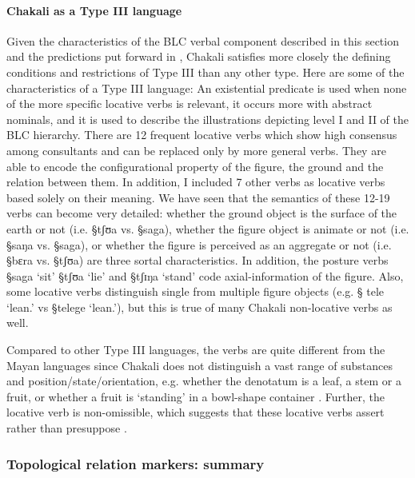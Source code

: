 \paragraph{Chakali as a Type III language}
\label{sec:SPA-cover-v}

Given the characteristics of the BLC  verbal component described in this
section and the predictions put forward in \citet[857, 863-864, 865]{Amek07b},
Chakali  satisfies more closely the defining conditions and restrictions of Type
III than any other type. Here are some of the characteristics of  a Type III
language: An existential predicate is used when
none of the more specific locative verbs is relevant, it occurs more with
abstract nominals, and it is used to describe  the  illustrations depicting
level I and II of the BLC hierarchy. There are 12 frequent locative verbs which 
show high consensus among consultants and can be replaced only by more general
verbs. They are able to encode the configurational property of the figure,
the ground
and  the relation between them. In addition, I  included 7 other verbs as
locative verbs based solely on their meaning. We have seen that the semantics of
these
12-19 verbs  can become very detailed: whether the ground object is the surface
of the earth or not (i.e.  {\S tʃʊa} vs. {\S saga}), whether the figure object
is animate or not  (i.e.  {\S saŋa} vs. {\S saga}),  or whether the figure is
perceived as an aggregate or not  (i.e.  {\S bɛra} vs. {\S tʃʊa}) are three
sortal characteristics. In addition, the posture verbs {\S saga} `sit' {\S tʃʊa}
`lie'
and {\S tʃɪŋa} `stand'   code  axial-information of the figure. Also, some
locative verbs distinguish single from multiple  figure objects (e.g. {\S
tele} `lean.{\sg}' vs {\S telege}  `lean.{\pl}'),  but this is true of many
Chakali non-locative verbs as well. 

Compared to  other Type III languages, the verbs are quite
different from the Mayan languages since  Chakali does
not distinguish a vast range of substances and position/state/orientation, e.g. 
whether the denotatum is a
leaf, a stem or a fruit,  or whether a fruit is `standing' in a
bowl-shape container \citep[247]{Brow06}. Further, the locative verb is
non-omissible, which suggests that  these locative
verbs assert rather than presuppose \cite[857]{Amek07b}.





\subsubsection{Topological relation markers: summary}
\label{sec:SPA-TRM-sum}

